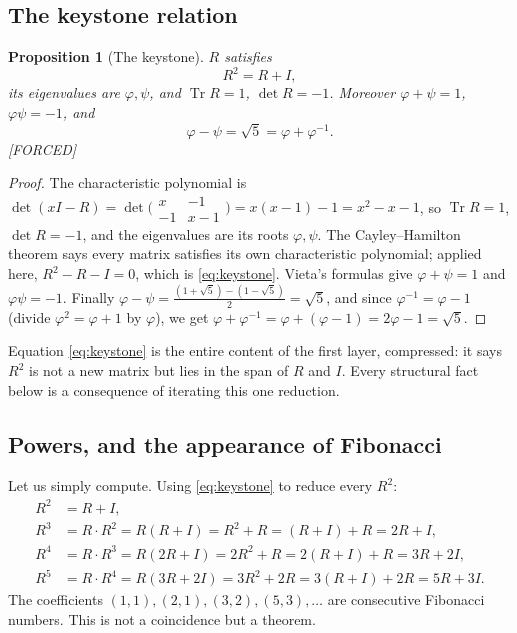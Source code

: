 \documentclass[11pt]{article}
\theoremstyle{plain}
\newtheorem{proposition}[theorem]{Proposition}
\theoremstyle{definition}
\theoremstyle{remark}
\newcommand{\Forced}{\textcolor{forcedc}{[FORCED]}}
\newcommand{\Tr}{\operatorname{Tr}}
\begin{document}
\subsection{The keystone relation}
\begin{proposition}[The keystone]\label{prop:keystone}
$R$ satisfies
\begin{equation}\label{eq:keystone}
R^{2}=R+I,
\end{equation}
its eigenvalues are $φ,ψ$, and $\Tr R=1$, $\det R=-1$. Moreover $φ+ψ=1$, $φψ=-1$, and
\begin{equation}\label{eq:root5}
φ-ψ=\sqrt5=φ+φ^{-1}.
\end{equation}
\Forced
\end{proposition}
\begin{proof}
The characteristic polynomial is $\det(xI-R)=\det\bigl(\begin{smallmatrix}x&-1\\-1&x-1\end{smallmatrix}\bigr)=x(x-1)-1=x^{2}-x-1$, so $\Tr R=1$, $\det R=-1$, and the eigenvalues are its roots $φ,ψ$. The Cayley--Hamilton theorem says every matrix satisfies its own characteristic polynomial; applied here, $R^{2}-R-I=0$, which is \eqref{eq:keystone}. Vieta's formulas give $φ+ψ=1$ and $φψ=-1$. Finally $φ-ψ=\tfrac{(1+\sqrt5)-(1-\sqrt5)}{2}=\sqrt5$, and since $φ^{-1}=φ-1$ (divide $φ^{2}=φ+1$ by $φ$), we get $φ+φ^{-1}=φ+(φ-1)=2φ-1=\sqrt5$.
\end{proof}

Equation \eqref{eq:keystone} is the entire content of the first layer, compressed: it says $R^{2}$ is not a new matrix but lies in the span of $R$ and $I$. Every structural fact below is a consequence of iterating this one reduction.

\subsection{Powers, and the appearance of Fibonacci}
Let us simply compute. Using \eqref{eq:keystone} to reduce every $R^{2}$:
\[
\begin{aligned}
R^{2}&=R+I,\\
R^{3}&=R\cdot R^{2}=R(R+I)=R^{2}+R=(R+I)+R=2R+I,\\
R^{4}&=R\cdot R^{3}=R(2R+I)=2R^{2}+R=2(R+I)+R=3R+2I,\\
R^{5}&=R\cdot R^{4}=R(3R+2I)=3R^{2}+2R=3(R+I)+2R=5R+3I.
\end{aligned}
\]
The coefficients $(1,1),(2,1),(3,2),(5,3),\dots$ are consecutive Fibonacci numbers. This is not a coincidence but a theorem.
\end{document}
